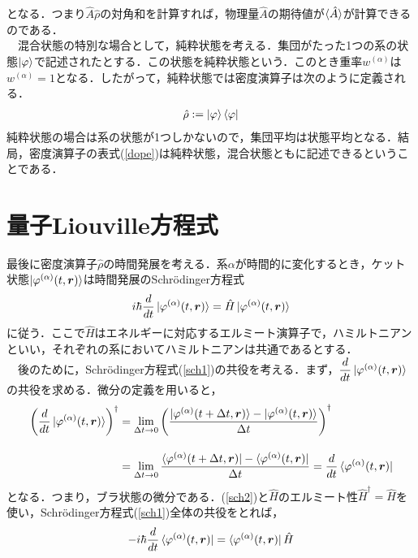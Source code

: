 \documentclass[12pt]{jsarticle}\usepackage{ifthen}\newboolean{enlarge}\setboolean{enlarge}{false}
\newcommand{\vr}{{\bm{r}}} %
\begin{document}
となる．つまり$\hat{A}\hat{\rho}$の対角和を計算すれば，物理量$\hat{A}$の期待値が$\braket{\hat{A}}$が計算できるのである．\\
　混合状態の特別な場合として，純粋状態を考える．集団がたった1つの系の状態$\ket{\varphi}$で記述されたとする．この状態を純粋状態という．このとき重率$w^{(\alpha)}$は$w^{(\alpha)}=1$となる．したがって，純粋状態では密度演算子は次のように定義される．
\begin{align}
\hat{\rho}:=
\ket{\varphi}\bra{\varphi}
\end{align}
純粋状態の場合は系の状態が1つしかないので，集団平均は状態平均となる．結局，密度演算子の表式(\ref{dope})は純粋状態，混合状態ともに記述できるということである．



%
\section{量子Liouville方程式}
最後に密度演算子$\hat{\rho}$の時間発展を考える．系$\alpha$が時間的に変化するとき，ケット状態$\ket{\varphi^{(\alpha)}(t,\vr)}$は時間発展のSchr\"{o}dinger方程式
\begin{align}
\label{sch1}
i\hbar\frac{d}{dt}\ket{\varphi^{(\alpha)}(t,\vr)}=\hat{H}\ket{\varphi^{(\alpha)}(t,\vr)}
\end{align}
に従う．ここで$\hat{H}$はエネルギーに対応するエルミート演算子で，ハミルトニアンといい，それぞれの系においてハミルトニアンは共通であるとする．\\
　後のために，Schr\"{o}dinger方程式(\ref{sch1})の共役を考える．まず，$\dfrac{d}{dt}\ket{\varphi^{(\alpha)}(t,\vr)}$の共役を求める．微分の定義を用いると，
　\begin{align}
\label{sch2}
\left(
\frac{d}{dt}\ket{\varphi^{(\alpha)}(t,\vr)}
\right)^\dag
&=
\lim_{\Delta t\to 0} 
\left(
\frac{
\ket{\varphi^{(\alpha)}(t+\Delta t,\vr)}
-\ket{\varphi^{(\alpha)}(t,\vr)}
}
{\Delta t}
\right)^\dag\notag\\[10pt]
%
&=
\lim_{\Delta t\to 0} 
\frac{
\bra{\varphi^{(\alpha)}(t+\Delta t,\vr)}
-\bra{\varphi^{(\alpha)}(t,\vr)}
}
{\Delta t}=\frac{d}{dt}\bra{\varphi^{(\alpha)}(t,\vr)}
\end{align}
となる．つまり，ブラ状態の微分である．(\ref{sch2})と$\hat{H}$のエルミート性$\hat{H}^\dag=\hat{H}$を使い，Schr\"{o}dinger方程式(\ref{sch1})全体の共役をとれば，
\begin{align}
\label{sch3}
-i\hbar\frac{d}{dt}\bra{\varphi^{(\alpha)}(t,\vr)}=\bra{\varphi^{(\alpha)}(t,\vr)}\hat{H}
\end{align}
\end{document}
